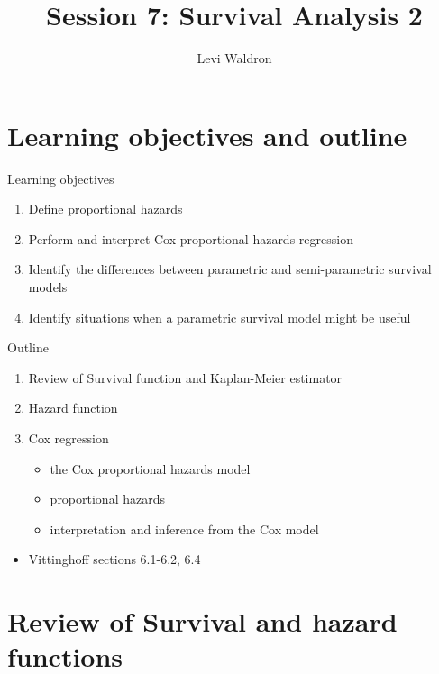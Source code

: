 \documentclass[
  ignorenonframetext,
]{beamer}
\title{Session 7: Survival Analysis 2}
\author{Levi Waldron}
\date{}
\institute{CUNY SPH Biostatistics 2}
\providecommand{\tightlist}{%
  \setlength{\itemsep}{0pt}\setlength{\parskip}{0pt}}
\begin{document}
\frame{\titlepage}

\hypertarget{learning-objectives-and-outline}{%
\section{Learning objectives and
outline}\label{learning-objectives-and-outline}}

\begin{frame}{Learning objectives}
\protect\hypertarget{learning-objectives}{}

\begin{enumerate}
\tightlist
\item
  Define proportional hazards
\item
  Perform and interpret Cox proportional hazards regression
\item
  Identify the differences between parametric and semi-parametric
  survival models
\item
  Identify situations when a parametric survival model might be useful
\end{enumerate}

\end{frame}

\begin{frame}{Outline}
\protect\hypertarget{outline}{}

\begin{enumerate}
\tightlist
\item
  Review of Survival function and Kaplan-Meier estimator
\item
  Hazard function
\item
  Cox regression

  \begin{itemize}
  \tightlist
  \item
    the Cox proportional hazards model
  \item
    proportional hazards
  \item
    interpretation and inference from the Cox model
  \end{itemize}
\end{enumerate}

\begin{itemize}
\tightlist
\item
  Vittinghoff sections 6.1-6.2, 6.4
\end{itemize}

\end{frame}

\hypertarget{review-of-survival-and-hazard-functions}{%
\section{Review of Survival and hazard
functions}\label{review-of-survival-and-hazard-functions}}
\end{document}
